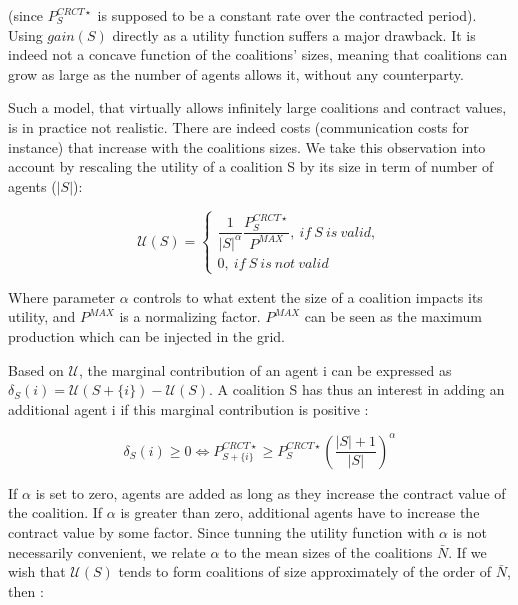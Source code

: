 \documentclass[conference]{IEEEtran}
\begin{document}
(since $ P_{S}^{CRCT \star} $ is supposed to be a constant rate over the contracted period). Using $ gain(S) $ directly as a utility function suffers a major drawback. It is indeed not a concave function of the coalitions' sizes, meaning that coalitions can grow as large as the number of agents allows it, without any counterparty. 

Such a model, that virtually allows infinitely large coalitions and contract values, is in practice not realistic. There are indeed costs (communication costs for instance) that increase with the coalitions sizes. We take this observation into account by rescaling the utility of a coalition S by its size in term of number of agents ($|S|$):

\begin{equation}
\mathcal{U}(S) = \left\{ \begin{array}{lll}
							\dfrac{1}{|S|^{\alpha}} \dfrac{ P_{S}^{CRCT \star} }{P^{MAX}},\ if\ S\ is\ valid, \\
							0,\ if\ S\ is\ not\ valid
						 \end{array}
				  \right.
\end{equation}

Where parameter $ \alpha $ controls to what extent the size of a coalition impacts its utility, and $ P^{MAX} $ is a normalizing factor. $ P^{MAX} $ can be seen as the maximum production which can be injected in the grid.

Based on $ \mathcal{U} $, the marginal contribution of an agent i can be expressed as $ \delta_{S}(i) = \mathcal{U}(S+\{i\}) - \mathcal{U}(S) $. A coalition S has thus an interest in adding an additional agent i if this marginal contribution is positive : 

\begin{equation}
\delta_{S}(i) \geq 0 \Leftrightarrow P_{S+\{i\}}^{CRCT \star} \geq P_{S}^{CRCT \star} \left( \dfrac{|S|+1}{|S|} \right)^{\alpha}
\label{eq:marginal_benefit}
\end{equation}

If $ \alpha $ is set to zero, agents are added as long as they increase the contract value of the coalition. If $ \alpha $ is greater than zero, additional agents have to increase the contract value by some factor. Since tunning the utility function with $ \alpha $ is not necessarily convenient, we relate $ \alpha $ to the mean sizes of the coalitions $ \bar{N} $. If we wish that $ \mathcal{U}(S) $ tends to form coalitions of size approximately of the order of $ \bar{N} $, then :
\end{document}
